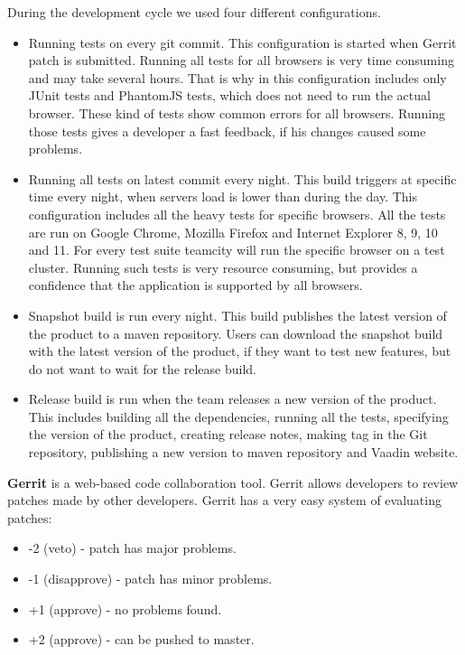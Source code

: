 \documentclass{article}
\begin{document}
  During the development cycle we used four different configurations.
  \begin{itemize}
  \item Running tests on every git commit. This configuration is started when Gerrit patch is submitted.
   Running all tests for all browsers is very time consuming and may take several hours. 
   That is why in this configuration includes only JUnit tests and PhantomJS
   tests, which does not need to run the actual browser. These kind of tests show common errors for all browsers.
   Running those tests gives a developer a fast feedback, if his changes caused some problems.
   \item Running all tests on latest commit every night. This build triggers at
    specific time every night, when servers load is lower than during the day.
    This configuration includes all the heavy tests for specific browsers. All
    the tests are run on Google Chrome, Mozilla Firefox and Internet Explorer 8, 9, 10 and 11. 
    For every test suite teamcity will run the specific browser on a test
    cluster. Running such tests is very resource consuming, but provides a
    confidence that the application is supported by all browsers.
    \item Snapshot build is run every night. This build publishes the latest
    version of the product to a maven repository.  Users can download
    the snapshot build with the latest version of the product, if they want to
    test new features, but do not want to wait for the release build.
    \item Release build is run when the team releases a new version of the
    product. This includes building all the dependencies, running all the tests,
    specifying the version of the product, creating release notes, making tag in
    the Git repository, publishing a new version to maven repository and Vaadin
    website.
   \end{itemize}

\textbf{Gerrit} is a web-based code collaboration tool. Gerrit allows developers to
  review patches made by other developers. Gerrit has a very easy system of evaluating patches:
  \begin{itemize}
  \item -2 (veto) - patch has major problems.
  \item -1 (disapprove) - patch has minor problems.
  \item +1 (approve) - no problems found.
  \item +2 (approve) - can be pushed to master.
  \end{itemize}
  
\end{document}

